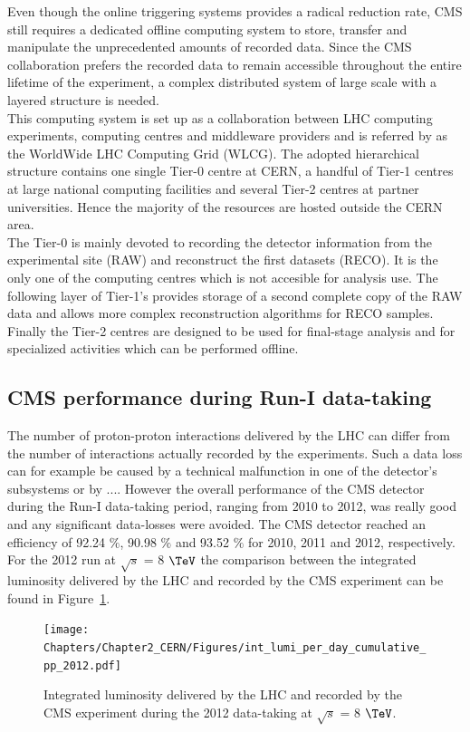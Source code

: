 Even though the online triggering systems provides a radical reduction rate, CMS still requires a dedicated offline computing system to store, transfer and manipulate the unprecedented amounts of recorded data. Since the CMS collaboration prefers the recorded data to remain accessible throughout the entire lifetime of the experiment, a complex distributed system of large scale with a layered structure is needed.
\\
This computing system is set up as a collaboration between LHC computing experiments, computing centres and middleware providers and is referred by as the WorldWide LHC Computing Grid (WLCG). The adopted hierarchical structure contains one single Tier-0 centre at CERN, a handful of Tier-1 centres at large national computing facilities and several Tier-2 centres at partner universities. Hence the majority of the resources are hosted outside the CERN area. 
\\
The Tier-0 is mainly devoted to recording the detector information from the experimental site (RAW) and reconstruct the first datasets (RECO). It is the only one of the computing centres which is not accesible for analysis use. The following layer of Tier-1's provides storage of a second complete copy of the RAW data and allows more complex reconstruction algorithms for RECO samples. Finally the Tier-2 centres are designed to be used for final-stage analysis and for specialized activities which can be performed offline.

\subsection{CMS performance during Run-I data-taking}

The number of proton-proton interactions delivered by the LHC can differ from the number of interactions actually recorded by the experiments. 
Such a data loss can for example be caused by a technical malfunction in one of the detector's subsystems or by .... However the overall performance of the CMS detector during the Run-I data-taking period, ranging from 2010 to 2012, was really good and any significant data-losses were avoided. 
The CMS detector reached an efficiency of 92.24 $\%$, 90.98 $\%$ and 93.52 $\%$ for 2010, 2011 and 2012, respectively. For the 2012 run at $\sqrt{s}$ = 8 $\TeV$ the comparison between the integrated luminosity delivered by the LHC and recorded by the CMS experiment can be found in Figure~\ref{fig::LumiEff}.

\begin{figure}[h!t]
 \centering
 \texttt{[image: Chapters/Chapter2\_CERN/Figures/int\_lumi\_per\_day\_cumulative\_pp\_2012.pdf]}
 \caption{Integrated luminosity delivered by the LHC and recorded by the CMS experiment during the 2012 data-taking at $\sqrt{s}$ = 8 $\TeV$.} \label{fig::LumiEff}
\end{figure}

